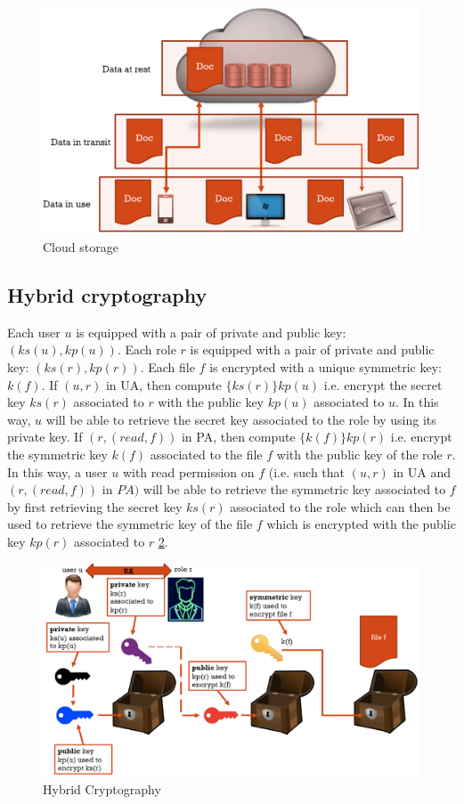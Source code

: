 \begin{figure}
	\centering
	\includegraphics[width=0.7\linewidth]{Images/Chapter8/cloud_storage}
	\caption{Cloud storage}
	\label{fig:cloudstorage}
\end{figure}

\subsection{Hybrid cryptography}

Each user $u$ is equipped with a pair of private and public key: $(ks(u),kp(u))$. Each role $r$ is equipped with a pair of private and public key: $(ks(r),kp(r))$. Each file $f$ is encrypted with a unique symmetric key: $k(f)$. If $(u,r)$ in UA, then compute $\{ks(r)\}kp(u)$ i.e. encrypt the secret key $ks(r)$ associated to $r$ with the public key $kp(u)$ associated to $u$. In this way, $u$ will be able to retrieve the secret key associated to the role by using its private key. If $(r, (read,f))$ in PA, then compute $\{k(f)\}kp(r)$ i.e. encrypt the symmetric key $k(f)$ associated to the file $f$ with the public key of the role $r$.  In this way, a user $u$ with read permission on $f$ (i.e. such that $(u,r)$ in UA and $(r,(read,f))$ in $PA)$ will be able to retrieve the symmetric key associated to $f$ by first retrieving the secret key $ks(r)$ associated to the role which can then be used to retrieve the symmetric key of the file $f$ which is encrypted with the public key $kp(r)$ associated to $r$ \ref{fig:hybridcrypto}.

\begin{figure}
	\centering
	\includegraphics[width=0.7\linewidth]{Images/Chapter8/hybrid_crypto}
	\caption{Hybrid Cryptography}
	\label{fig:hybridcrypto}
\end{figure}

